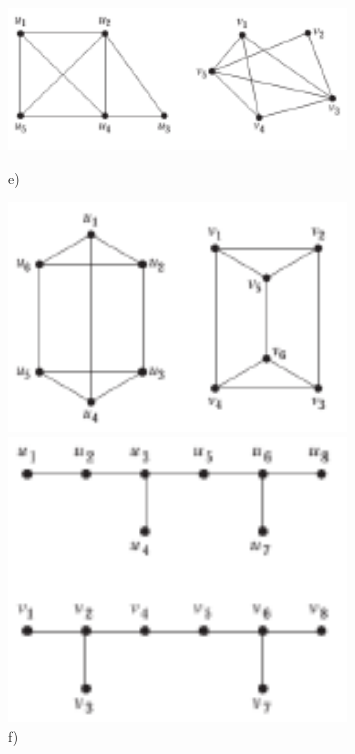 \documentclass[a4paper]{article}
\begin{document}
	\newpage
	\begin{figure}[ht]
		\begin{minipage}{0.5\textwidth}
			\centering
			\includegraphics[width=0.8\textwidth]{gprob4_5.png}
			\caption*{e)}
		\end{minipage}
		\begin{minipage}{0.5\textwidth}
			\centering
			\includegraphics[width=0.8\textwidth]{gprob4_6.png}
			\caption*{f)}
		\end{minipage}
		\begin{minipage}{0.5\textwidth}
			\centering
			\includegraphics[width=0.8\textwidth]{gprob4_7.png}

\end{minipage}
\end{figure}
\end{document}
